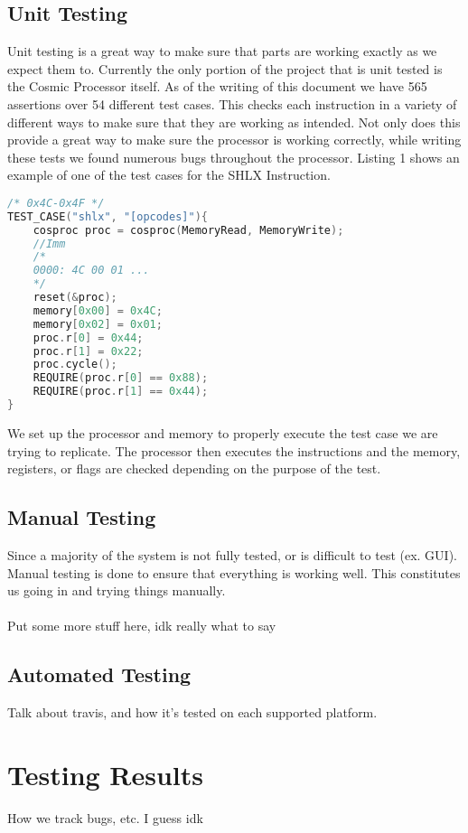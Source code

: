 \documentclass[conference]{IEEEtran}
\begin{document}
\subsection{Unit Testing}
Unit testing is a great way to make sure that parts are working exactly as we expect them to. Currently the only portion of the project that is unit tested is the Cosmic Processor itself. As of the writing of this document we have 565 assertions over 54 different test cases. This checks each instruction in a variety of different ways to make sure that they are working as intended. Not only does this provide a great way to make sure the processor is working correctly, while writing these tests we found numerous bugs throughout the processor. Listing 1 shows an example of one of the test cases for the SHLX Instruction. 
\begin{lstlisting}[language=C++, caption=A Unit Test for the SHLX Instruction]
/* 0x4C-0x4F */
TEST_CASE("shlx", "[opcodes]"){
    cosproc proc = cosproc(MemoryRead, MemoryWrite);
    //Imm
    /*
    0000: 4C 00 01 ...
    */
    reset(&proc);
    memory[0x00] = 0x4C;
    memory[0x02] = 0x01;
    proc.r[0] = 0x44;
    proc.r[1] = 0x22;
    proc.cycle();
    REQUIRE(proc.r[0] == 0x88);
    REQUIRE(proc.r[1] == 0x44);
}
\end{lstlisting}
We set up the processor and memory to properly execute the test case we are trying to replicate. The processor then executes the instructions and the memory, registers, or flags are checked depending on the purpose of the test.

\subsection{Manual Testing}
Since a majority of the system is not fully tested, or is difficult to test (ex. GUI). Manual testing is done to ensure that everything is working well. This constitutes us going in and trying things manually. \\\\Put some more stuff here, idk really what to say
\subsection{Automated Testing}
Talk about travis, and how it's tested on each supported platform.

\section{Testing Results}
How we track bugs, etc. I guess idk
\end{document}
